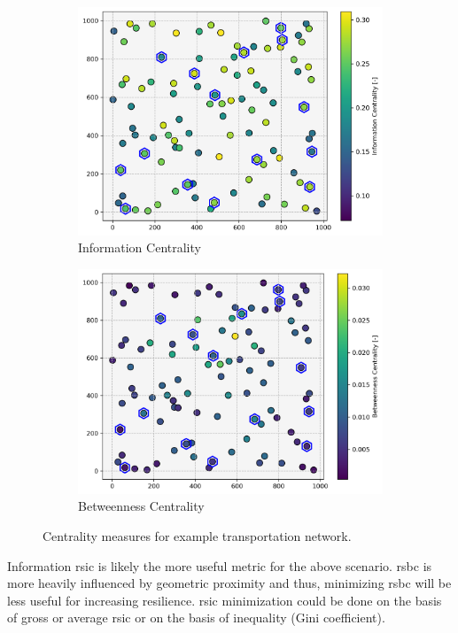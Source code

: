 \begin{figure}[H]
	\centering
	\begin{subfigure}[t]{.5\linewidth}
		\centering\includegraphics[width = \linewidth]{figs/information_centrality.png}
		\captionsetup{width=.8\linewidth}
		\caption{Information Centrality}
	\end{subfigure}%
	\begin{subfigure}[t]{.5\linewidth}
		\centering\includegraphics[width = \linewidth]{figs/betweenness_centrality.png}
		\captionsetup{width=.8\linewidth}
		\caption{Betweenness Centrality}
	\end{subfigure}
	\caption{Centrality measures for example transportation network.}
	\label{fig:bev_centrality}
\end{figure}

Information \gls{rsic} is likely the more useful metric for the above scenario. \gls{rsbc} is more heavily influenced by geometric proximity and thus, minimizing \gls{rsbc} will be less useful for increasing resilience. \gls{rsic} minimization could be done on the basis of gross or average \gls{rsic} or on the basis of inequality (Gini coefficient).